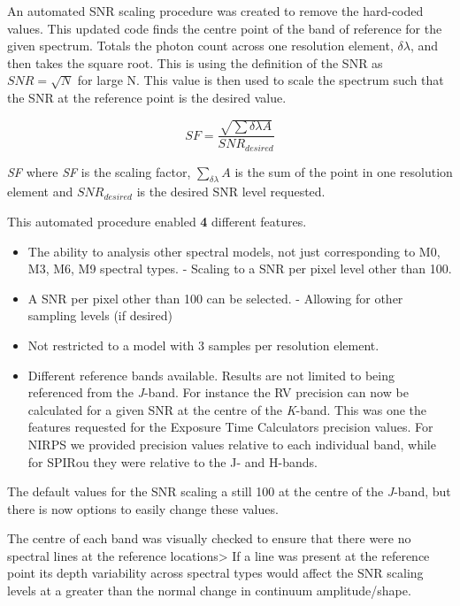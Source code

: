 An automated {SNR} scaling procedure was created to remove the hard-coded values. This updated code finds the centre point of the band of reference for the given spectrum. Totals the photon count across one resolution element, \(\delta\lambda\), and then takes the square root. This is using the definition of the {SNR} as \({SNR} = \sqrt{N}\) for large N. This value is then used to scale the spectrum such that the {SNR} at the reference point is the desired value.

\begin{equation}
    SF =  \frac{\sqrt{\sum{\delta\lambda} A}} {SNR_{desired}}
\end{equation}

\textit{SF} where \textit{SF} is the scaling factor, \(\sum_{\delta\lambda} A\) is the sum of the point in one resolution element and \({SNR}_{desired}\) is the desired {SNR} level requested.

This automated procedure enabled {\red{}\textbf{4}} different features.
\begin{itemize}
\item The ability to analysis other spectral models, not just corresponding to {M0}, {M3}, {M6}, {M9} spectral types.
    - Scaling to a {SNR} per pixel level other than 100.
\item    A {SNR} per pixel other than 100 can be selected.
    - Allowing for other sampling levels (if desired)
\item      Not restricted to a model with 3 samples per resolution element.
\item Different reference bands available.
    Results are not limited to being referenced from the \textit{J}-band. For instance the {RV} precision can now be calculated for a given {SNR} at the centre of the \textit{K}-band. This was one the features requested for the Exposure Time Calculators precision values. For {NIRPS} we provided precision values relative to each individual band, while for {SPIRou} they were relative to the {J}- and {H}-bands.
\end{itemize}
The default values for the {SNR} scaling a still 100 at the centre of the \textit{J}-band, but there is now options to easily change these values.

The centre of each band was visually checked to ensure that there were no spectral lines at the reference locations> If a line was present at the reference point its depth variability across spectral types would affect the {SNR} scaling levels at a greater than the normal change in continuum amplitude/shape.

